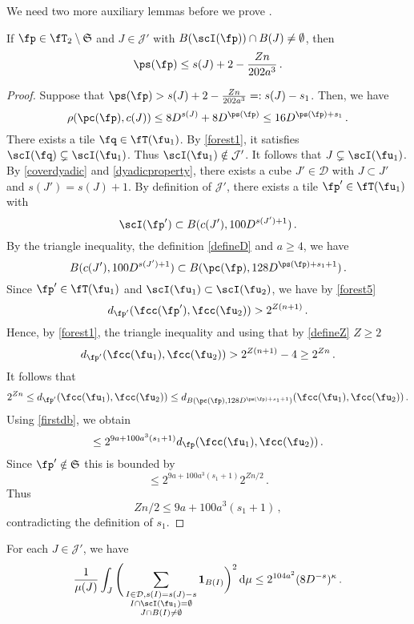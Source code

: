     We need two more auxiliary lemmas before we prove .

    \begin{lemma}
        \label{thin-scale-impact}
        If $\fp \in \fT_2 \setminus \mathfrak{S}$ and $J \in \mathcal{J'}$ with $B(\scI(\fp)) \cap B(J) \ne \emptyset$, then
        $$
            \ps(\fp) \le s(J) + 2 - \frac{Zn}{202a^3}\,.
        $$
    \end{lemma}

    \begin{proof}
        Suppose that $\ps(\fp) > s(J) + 2 -\frac{Zn}{202a^3} =: s(J) - s_1$. Then, we have
        $$
            \rho(\pc(\fp), c(J)) \le 8D^{s(J)}+8D^{\ps(\fp)} \le 16 D^{\ps(\fp) + s_1}\,.
        $$
        There exists a tile $\fq \in \fT(\fu_1)$. By \eqref{forest1}, it satisfies $\scI(\fq) \subsetneq \scI(\fu_1)$. Thus $\scI(\fu_1) \notin \mathcal{J}'$. It follows that $J \subsetneq \scI(\fu_1)$. By \eqref{coverdyadic} and \eqref{dyadicproperty}, there exists a cube $J' \in \mathcal{D}$ with $J \subset J'$ and $s(J') = s(J) + 1$. By definition of $\mathcal{J}'$, there exists a tile $\fp' \in \fT(\fu_1)$ with
        $$
            \scI(\fp') \subset B(c(J'), 100 D^{s(J') + 1})\,.
        $$
        By the triangle inequality, the definition \eqref{defineD} and $a \ge 4$, we have
        $$
            B(c(J'), 100 D^{s(J')+1}) \subset B(\pc(\fp), 128 D^{\ps(\fp) + s_1 + 1})\,.
        $$
        Since $\fp' \in \fT(\fu_1)$ and $\scI(\fu_1) \subset \scI(\fu_2)$, we have by \eqref{forest5}
        $$
            d_{\fp'}(\fcc(\fp'), \fcc(\fu_2)) > 2^{Z(n+1)}\,.
        $$
        Hence, by \eqref{forest1}, the triangle inequality and using that by \eqref{defineZ} $Z \ge 2$
        $$
            d_{\fp'}(\fcc(\fu_1), \fcc(\fu_2)) > 2^{Z(n+1)} - 4 \ge 2^{Zn}\,.
        $$
        It follows that
        $$
            2^{Zn} \le d_{\fp'}(\fcc(\fu_1), \fcc(\fu_2)) \le d_{B(\pc(\fp), 128 D^{\ps(\fp) + s_1+ 1})}(\fcc(\fu_1), \fcc(\fu_2))\,.
        $$
        Using \eqref{firstdb}, we obtain
        $$
            \le 2^{9a + 100a^3 (s_1+1)} d_{\fp}(\fcc(\fu_1), \fcc(\fu_2))\,.
        $$
        Since $\fp' \notin \mathfrak{S}$ this is bounded by
        $$
            \le 2^{9a + 100a^3 (s_1+1)} 2^{Zn/2}\,.
        $$
        Thus
        $$
            Z n/2 \le 9a + 100a^3(s_1 + 1)\,,
        $$
        contradicting the definition of $s_1$.
    \end{proof}

    \begin{lemma}
        \label{square-function-count}
        For each $J \in \mathcal{J}'$, we have
        $$
            \frac{1}{\mu(J)} \int_J \Bigg(\sum_{\substack{I \in \mathcal{D}, s(I) = s(J) - s\\ I \cap \scI(\fu_1) = \emptyset\\
        J \cap B(I) \ne \emptyset}} \mathbf{1}_{B(I)}\bigg)^2 \, \mathrm{d}\mu \le 2^{104a^2} (8 D^{-s})^\kappa\,.
        $$
    \end{lemma}

